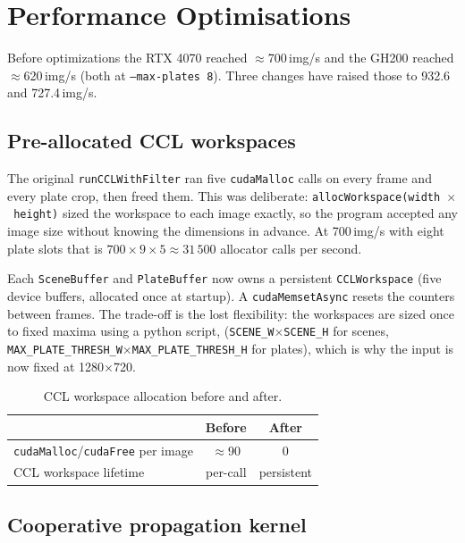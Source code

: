 \section{Performance Optimisations}
\label{sec:opts}

Before optimizations the RTX 4070 reached $\approx$700\,img/s and the GH200 reached $\approx$620\,img/s (both at \texttt{--max-plates 8}).
Three changes have raised those to 932.6 and 727.4\,img/s.

\subsection{Pre-allocated CCL workspaces}
\label{sec:workspace}

The original \texttt{runCCLWithFilter} ran five \texttt{cudaMalloc} calls on every frame and every plate crop, then freed them.
This was deliberate: \texttt{allocWorkspace(width\,$\times$\,height)} sized the workspace to each image exactly, so the program accepted any image size without knowing the dimensions in advance.
At 700\,img/s with eight plate slots that is $700 \times 9 \times 5 \approx 31\,500$ allocator calls per second.

Each \texttt{SceneBuffer} and \texttt{PlateBuffer} now owns a persistent \texttt{CCLWorkspace} (five device buffers, allocated once at startup).
A \texttt{cudaMemsetAsync} resets the counters between frames.
The trade-off is the lost flexibility: the workspaces are sized once to fixed maxima using a python script, (\texttt{SCENE\_W$\times$SCENE\_H} for scenes, \texttt{MAX\_PLATE\_THRESH\_W$\times$MAX\_PLATE\_THRESH\_H} for plates), which is why the input is now fixed at 1280$\times$720.

\begin{table}[H]
\centering
\begin{tabular}{lcc}
\toprule
 & Before & After \\
\midrule
\texttt{cudaMalloc}/\texttt{cudaFree} per image & $\approx$90 & 0 \\
CCL workspace lifetime & per-call & persistent \\
\bottomrule
\end{tabular}
\caption{CCL workspace allocation before and after.}
\label{tab:workspace}
\end{table}

\subsection{Cooperative propagation kernel}
\label{sec:coop}

